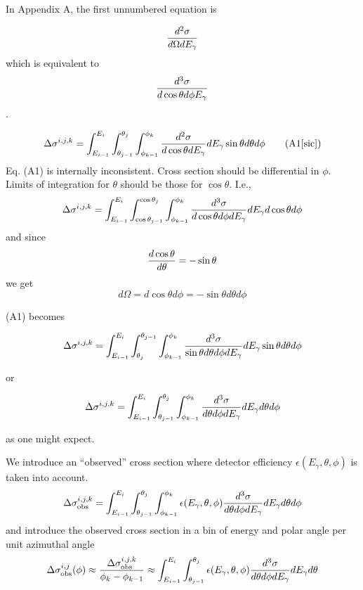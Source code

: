 \documentclass{article}
\begin{document}
In Appendix A, the first unnumbered equation is

\begin{equation}
      {d^2\sigma \over d\Omega dE_\gamma}
\end{equation}
which is equivalent to 
\begin{equation}
      {d^3\sigma \over d\cos\theta d\phi E_\gamma}
\end{equation}.

\begin{equation}
  \Delta\sigma^{i,j,k} = \int^{E_i}_{E_{i-1}}\int^{\theta_j}_{\theta_{j-1}}\int^{\phi_k}_{\phi_{k-1}} {d^2\sigma \over d\cos\theta dE_\gamma}dE_\gamma \sin\theta d\theta d\phi
  \tag{A1[sic]}
\end{equation}
Eq. (A1) is internally inconsistent. Cross section should be differential in $\phi$. Limits of integration for $\theta$ should be those for $\cos\theta$. I.e.,
\begin{equation}\Delta\sigma^{i,j,k} = \int^{E_i}_{E_{i-1}}\int^{\cos\theta_j}_{\cos\theta_{j-1}}\int^{\phi_k}_{\phi_{k-1}} {d^3\sigma \over d\cos\theta d\phi dE_\gamma}dE_\gamma d\cos\theta d\phi\end{equation}
and since
\begin{equation}{d\cos\theta \over d\theta} = -\sin\theta\end{equation}
we get
\begin{equation} d\Omega = d\cos\theta d\phi = -\sin\theta d\theta d\phi \end{equation}

(A1) becomes

\begin{equation}\Delta\sigma^{i,j,k} = \int^{E_i}_{E_{i-1}}\int_{\theta_j}^{\theta_{j-1}}\int^{\phi_k}_{\phi_{k-1}} {d^3\sigma \over \sin\theta d\theta d\phi dE_\gamma} dE_\gamma \sin\theta d\theta d\phi\end{equation}

or

\begin{equation}\Delta\sigma^{i,j,k} = \int^{E_i}_{E_{i-1}}\int_{\theta_{j-1}}^{\theta_j}\int^{\phi_k}_{\phi_{k-1}} {d^3\sigma \over d\theta d\phi dE_\gamma} dE_\gamma d\theta d\phi\end{equation}

as one might expect.

We introduce an ``observed'' cross section where detector efficiency $\epsilon(E_\gamma,\theta,\phi)$ is taken into account.
\begin{equation}
\Delta\sigma^{i,j,k}_{\rm obs} = \int^{E_i}_{E_{i-1}}\int_{\theta_{j-1}}^{\theta_j}\int^{\phi_k}_{\phi_{k-1}} \epsilon(E_\gamma,\theta,\phi) {d^3\sigma \over d\theta d\phi dE_\gamma} dE_\gamma d\theta d\phi
\end{equation}
and introduce the observed cross section in a bin of energy and polar angle per unit azimuthal angle
\begin{equation}
\Delta\sigma^{i,j}_{\rm obs}(\phi) \approx {\Delta\sigma^{i,j,k}_{\rm obs} \over \phi_k - \phi_{k-1}} \approx \int^{E_i}_{E_{i-1}}\int_{\theta_{j-1}}^{\theta_j} \epsilon(E_\gamma,\theta,\phi) {d^3\sigma \over d\theta d\phi dE_\gamma} dE_\gamma d\theta\end{equation}
\end{document}
